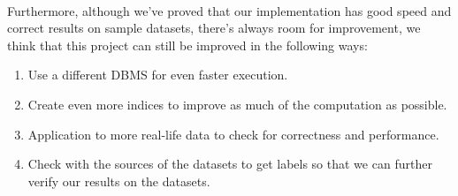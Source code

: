 \paragraph{} Furthermore, although we've proved that our implementation has good speed and correct results on sample datasets, there's always room for improvement, we think that this project can still be
improved in the following ways:
\begin{enumerate}
\item Use a different DBMS for even faster execution.
\item Create even more indices to improve as much of the computation as possible.
\item Application to more real-life data to check for correctness and performance.
\item Check with the sources of the datasets to get labels so that we can further verify our results on the datasets.
\end{enumerate}